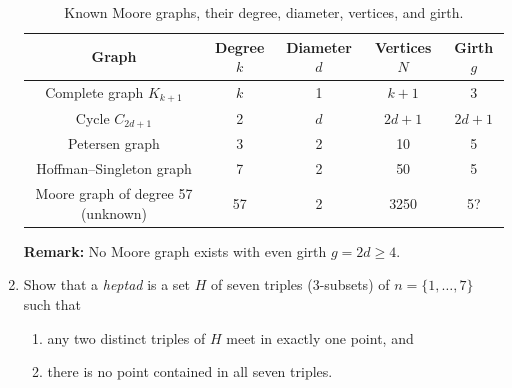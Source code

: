 \documentclass[12pt,a4paper,openany]{book}
\begin{document}
\begin{enumerate}
\begin{table}[h]
\centering
\begin{tabular}{|c|c|c|c|c|}
\hline
\textbf{Graph} & \textbf{Degree $k$} & \textbf{Diameter $d$} & \textbf{Vertices $N$} & \textbf{Girth $g$} \\
\hline
Complete graph $K_{k+1}$ & $k$ & 1 & $k+1$ & 3 \\
\hline
Cycle $C_{2d+1}$ & 2 & $d$ & $2d+1$ & $2d+1$ \\
\hline
Petersen graph & 3 & 2 & 10 & 5 \\
\hline
Hoffman–Singleton graph & 7 & 2 & 50 & 5 \\
\hline
Moore graph of degree 57 (unknown) & 57 & 2 & 3250 & 5? \\
\hline
\end{tabular}
\caption{Known Moore graphs, their degree, diameter, vertices, and girth.}
\end{table}



\noindent\textbf{Remark:} No Moore graph exists with even girth $g = 2d \ge 4$.

\item Show that a \emph{heptad} is a set $H$ of seven triples (3-subsets) of $n=\{1,\dots,7\}$ such that
\begin{enumerate}
    \item any two distinct triples of $H$ meet in exactly one point, and
    \item there is no point contained in all seven triples.
\end{enumerate}
\end{enumerate}
\end{document}
